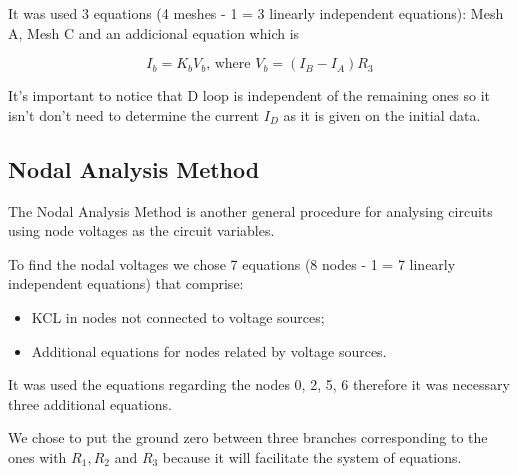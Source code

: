It was used 3 equations (4 meshes - 1 = 3 linearly independent equations): Mesh A, Mesh C and an addicional equation which is 

\begin{equation}
I_b = K_b V_b \textrm{, where } V_b = (I_B - I_A)R_3
\end{equation}

It's important to notice that D loop is independent of the remaining ones so it isn't don't need to determine the current $I_D$ as it is given on the initial data.


%    


\subsection{Nodal Analysis Method}

\hspace{0,5cm} The Nodal Analysis Method is another general procedure for analysing circuits using node voltages as the circuit variables. 

To find the nodal voltages we chose 7 equations (8 nodes - 1 = 7 linearly independent equations) that comprise:
\begin{itemize}
\item  KCL in nodes not connected to voltage sources;
\item Additional equations for nodes related by voltage sources.
\end{itemize}

It was used the equations regarding the nodes 0, 2, 5, 6 therefore it was necessary three additional equations.

We chose to put the ground zero between three branches corresponding to the ones with $R_1, R_2$ and $R_3$ because it will facilitate the system of equations.

